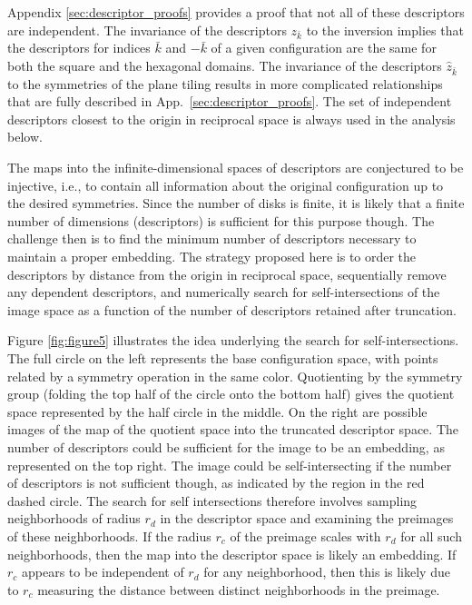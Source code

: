 \documentclass[default,iicol]{sn-jnl}%
\theoremstyle{thmstyleone}%
\theoremstyle{thmstyletwo}%
\theoremstyle{thmstylethree}%
\renewcommand{\vec}[1]{\bar{#1}}
\begin{document}
Appendix \ref{sec:descriptor_proofs} provides a proof that not all of these descriptors are independent. The invariance of the descriptors $z_{\vec{k}}$ to the inversion implies that the descriptors for indices $\vec{k}$ and $-\vec{k}$ of a given configuration are the same for both the square and the hexagonal domains. The invariance of the descriptors $\hat{z}_{\vec{k}}$ to the symmetries of the plane tiling results in more complicated relationships that are fully described in App.\ \ref{sec:descriptor_proofs}. The set of independent descriptors closest to the origin in reciprocal space is always used in the analysis below.

The maps into the infinite-dimensional spaces of descriptors are conjectured to be injective, i.e., to contain all information about the original configuration up to the desired symmetries. Since the number of disks is finite, it is likely that a finite number of dimensions (descriptors) is sufficient for this purpose though. The challenge then is to find the minimum number of descriptors necessary to maintain a proper embedding. The strategy proposed here is to order the descriptors by distance from the origin in reciprocal space, sequentially remove any dependent descriptors, and numerically search for self-intersections of the image space as a function of the number of descriptors retained after truncation.

Figure \ref{fig:figure5} illustrates the idea underlying the search for self-intersections. The full circle on the left represents the base configuration space, with points related by a symmetry operation in the same color. Quotienting by the symmetry group (folding the top half of the circle onto the bottom half) gives the quotient space represented by the half circle in the middle. On the right are possible images of the map of the quotient space into the truncated descriptor space. The number of descriptors could be sufficient for the image to be an embedding, as represented on the top right. The image could be self-intersecting if the number of descriptors is not sufficient though, as indicated by the region in the red dashed circle. The search for self intersections therefore involves sampling neighborhoods of radius $r_d$ in the descriptor space and examining the preimages of these neighborhoods. If the radius $r_c$ of the preimage scales with $r_d$ for all such neighborhoods, then the map into the descriptor space is likely an embedding. If $r_c$ appears to be independent of $r_d$ for any neighborhood, then this is likely due to $r_c$ measuring the distance between distinct neighborhoods in the preimage.
\end{document}
